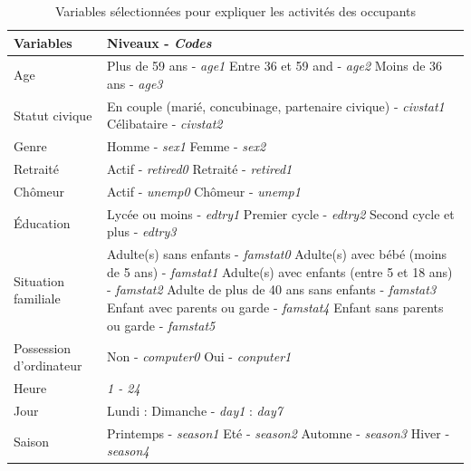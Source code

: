 \begin{table} [H]
\centering
\begin{tabular}{|p{4 cm}||p{11 cm}|}
\hline Variables & Niveaux - \textit{Codes} \\
\hline
\hline Age & Plus de 59 ans - \textit{age1} \newline Entre 36 et 59 and - \textit{age2} \newline Moins de 36 ans - \textit{age3} \\
\hline Statut civique & En couple (marié, concubinage, partenaire civique) - \textit{civstat1} \newline Célibataire - \textit{civstat2} \\
\hline Genre & Homme - \textit{sex1} \newline Femme - \textit{sex2} \\
\hline Retraité & Actif - \textit{retired0} \newline Retraité - \textit{retired1} \\
\hline Chômeur & Actif - \textit{unemp0} \newline Chômeur - \textit{unemp1} \\
\hline Éducation & Lycée ou moins - \textit{edtry1} \newline Premier cycle - \textit{edtry2} \newline Second cycle et plus - \textit{edtry3}  \\
\hline Situation familiale & Adulte(s) sans enfants - \textit{famstat0} \newline Adulte(s) avec bébé (moins de 5 ans) - \textit{famstat1} \newline Adulte(s) avec enfants (entre 5 et 18 ans) - \textit{famstat2} \newline Adulte de plus de 40 ans sans enfants - \textit{famstat3} \newline Enfant avec parents ou garde - \textit{famstat4} \newline Enfant sans parents ou garde - \textit{famstat5} \\
\hline Possession d'ordinateur & Non - \textit{computer0} \newline Oui - \textit{conputer1} \\
\hline Heure & \textit{1 - 24} \\
\hline Jour & Lundi : Dimanche - \textit{day1} : \textit{day7} \\
\hline Saison & Printemps - \textit{season1} \newline Eté - \textit{season2} \newline Automne - \textit{season3} \newline Hiver - \textit{season4} \\
\hline
\end{tabular}
\normalsize
\caption{Variables sélectionnées pour expliquer les activités des occupants}
\label{VariablesActivité}
\end{table}

